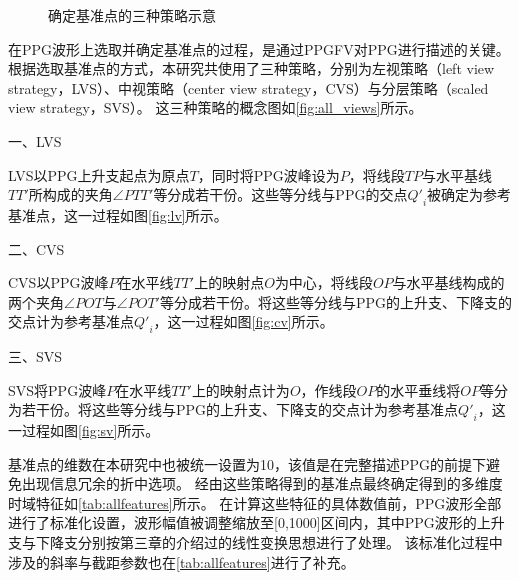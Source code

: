 \begin{figure}[htbp]
  \centering
  \quad
  \quad
  \caption{\label{fig:all_views}确定基准点的三种策略示意}
\end{figure}

在PPG波形上选取并确定基准点的过程，是通过PPGFV对PPG进行描述的关键。
根据选取基准点的方式，本研究共使用了三种策略，分别为左视策略（left view strategy，LVS）、中视策略（center view strategy，CVS）与分层策略（scaled view strategy，SVS）。
这三种策略的概念图如\autoref{fig:all_views}所示。

一、LVS

LVS以PPG上升支起点为原点$T$，同时将PPG波峰设为$P$，将线段$TP$与水平基线$TT'$所构成的夹角$\angle PTT'$等分成若干份。这些等分线与PPG的交点${Q'}_i$被确定为参考基准点，这一过程如图\autoref{fig:lv}所示。

二、CVS

CVS以PPG波峰$P$在水平线$TT'$上的映射点$O$为中心，将线段$OP$与水平基线构成的两个夹角$\angle POT$与$\angle POT'$等分成若干份。将这些等分线与PPG的上升支、下降支的交点计为参考基准点${Q'}_i$，这一过程如图\autoref{fig:cv}所示。

三、SVS

SVS将PPG波峰$P$在水平线$TT'$上的映射点计为$O$，作线段$OP$的水平垂线将$OP$等分为若干份。将这些等分线与PPG的上升支、下降支的交点计为参考基准点${Q'}_i$，这一过程如图\autoref{fig:sv}所示。

基准点的维数在本研究中也被统一设置为10，该值是在完整描述PPG的前提下避免出现信息冗余的折中选项。
经由这些策略得到的基准点最终确定得到的多维度时域特征如\autoref{tab:allfeatures}所示。
在计算这些特征的具体数值前，PPG波形全部进行了标准化设置，波形幅值被调整缩放至[0,1000]区间内，其中PPG波形的上升支与下降支分别按第三章的介绍过的线性变换思想进行了处理。
该标准化过程中涉及的斜率与截距参数也在\autoref{tab:allfeatures}进行了补充。

